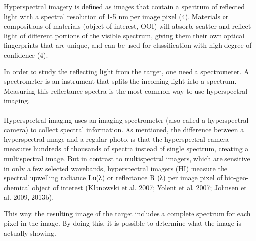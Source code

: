 Hyperspectral imagery is defined as images that contain a spectrum of reflected light with a spectral resolution of 1-5 nm per image pixel (4). Materials or compositions of materials (object of interest, OOI) will absorb, scatter and reflect light of different portions of the visible spectrum, giving them their own optical fingerprints that are unique, and can be used for classification with high degree of confidence (4). 

In order to study the reflecting light from the target, one need a spectrometer. A spectrometer is an instrument that splits the incoming light into a spectrum. Measuring this reflectance spectra is the most common way to use hyperspectral imaging.
\\\\
Hyperspectral imaging uses an imaging spectrometer (also called a hyperspectral camera) to collect spectral information. As mentioned, the difference between a hyperspectral image and a regular photo, is that the hyperspectral camera measures hundreds of thousands of spectra instead of single spectrum, creating a multispectral image. But in contrast to multispectral imagers, which are sensitive in only a few selected wavebands, hyperspectral imagers (HI) measure the spectral upwelling radiance Lu(λ) or reflectance R (λ) per image pixel of bio-geo-chemical object of interest (Klonowski et al. 2007; Volent et al. 2007; Johnsen et al. 2009, 2013b). %

This way, the resulting image of the target includes a complete spectrum for each pixel in the image. By doing this, it is possible to determine what the image is actually showing. 

\\\\

